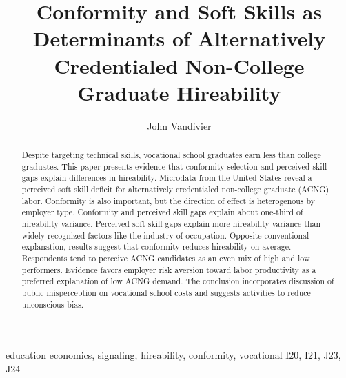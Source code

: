 \documentclass[review]{elsarticle}
\begin{document}
\begin{frontmatter}

    \title{
        Conformity and Soft Skills as Determinants of Alternatively Credentialed Non-College Graduate Hireability
    }

    \author[mymainaddress]{John Vandivier}
    \address[mymainaddress]{4400 University Dr, Fairfax, VA 22030}

    \begin{abstract}
        Despite targeting technical skills,
        vocational school graduates earn less than college graduates.
        This paper presents evidence that
        conformity selection and perceived skill gaps explain differences in hireability.
        Microdata from the United States
        reveal a perceived soft skill deficit for
        alternatively credentialed non-college graduate (ACNG) labor.
        Conformity is also important,
        but the direction of effect is heterogenous by employer type.
        Conformity and perceived skill gaps explain about one-third of hireability variance.
        Perceived soft skill gaps explain more hireability variance than widely recognized factors like the industry of occupation.
        Opposite conventional explanation, results suggest that conformity reduces hireability on average.
        Respondents tend to perceive ACNG candidates as an even mix of high and low performers.
        Evidence favors employer risk aversion toward labor productivity as a preferred explanation of low ACNG demand.
        The conclusion incorporates discussion of public misperception on vocational school costs and suggests activities to reduce unconscious bias.
    \end{abstract}

    \begin{keyword}
        education economics, signaling, hireability, conformity, vocational               %
        \MSC[2010] I20, I21, J23, J24                                                     %
    \end{keyword}

\end{frontmatter}
\end{document}
